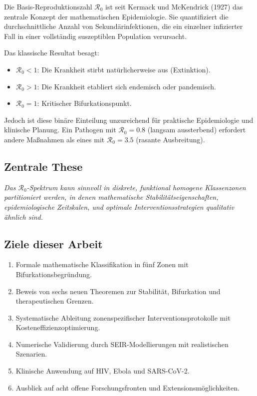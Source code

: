 ﻿\documentclass[a4paper,12pt,twoside]{article}
\theoremstyle{definition}
\begin{document}
Die Basis-Reproduktionszahl $\mathcal{R}_0$ ist seit Kermack und McKendrick (1927) das zentrale Konzept der mathematischen Epidemiologie. Sie quantifiziert die durchschnittliche Anzahl von Sekundärinfektionen, die ein einzelner infizierter Fall in einer vollständig suszeptiblen Population verursacht.

Das klassische Resultat besagt:
\begin{itemize}
\item $\mathcal{R}_0 < 1$: Die Krankheit stirbt natürlicherweise aus (Extinktion).
\item $\mathcal{R}_0 > 1$: Die Krankheit etabliert sich endemisch oder pandemisch.
\item $\mathcal{R}_0 = 1$: Kritischer Bifurkationspunkt.
\end{itemize}

Jedoch ist diese binäre Einteilung unzureichend für praktische Epidemiologie und klinische Planung. Ein Pathogen mit $\mathcal{R}_0 = 0.8$ (langsam aussterbend) erfordert andere Maßnahmen als eines mit $\mathcal{R}_0 = 3.5$ (rasante Ausbreitung).

\subsection{Zentrale These}

\emph{Das $\mathcal{R}_0$-Spektrum kann sinnvoll in diskrete, funktional homogene Klassenzonen partitioniert werden, in denen mathematische Stabilitätseigenschaften, epidemiologische Zeitskalen, und optimale Interventionsstrategien qualitativ ähnlich sind.}

\subsection{Ziele dieser Arbeit}

\begin{enumerate}
\item Formale mathematische Klassifikation in fünf Zonen mit Bifurkationsbegründung.
\item Beweis von sechs neuen Theoremen zur Stabilität, Bifurkation und therapeutischen Grenzen.
\item Systematische Ableitung zonenspezifischer Interventionsprotokolle mit Kosteneffizienzoptimierung.
\item Numerische Validierung durch SEIR-Modellierungen mit realistischen Szenarien.
\item Klinische Anwendung auf HIV, Ebola und SARS-CoV-2.
\item Ausblick auf acht offene Forschungsfronten und Extensionsmöglichkeiten.
\end{enumerate}
\end{document}

